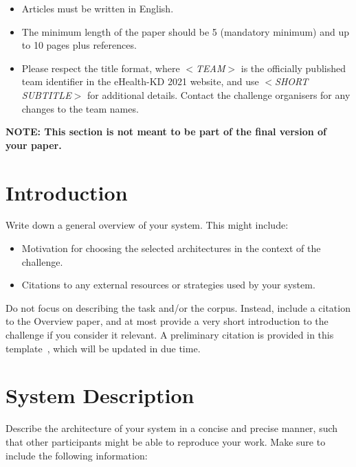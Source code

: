 \documentclass[
]{ceurart}
\begin{document}
\begin{itemize}
    \item Articles must be written in English.
    \item The minimum length of the paper should be 5 (mandatory minimum) and up to 10 pages plus references.
    \item Please respect the title format, where \textit{$<$TEAM$>$} is the officially published team identifier in the eHealth-KD 2021 website, and use \textit{$<$SHORT SUBTITLE$>$} for additional details. 
    Contact the challenge organisers for any changes to the team names.
\end{itemize}

\textbf{NOTE: This section is not meant to be part of the final version of your paper.}

\section{Introduction}

Write down a general overview of your system. This might include:
\begin{itemize}
    \item Motivation for choosing the selected architectures in the context of the challenge.
    \item Citations to any external resources or strategies used by your system.
\end{itemize}

Do not focus on describing the task and/or the corpus. Instead, include a citation to the Overview paper, and at most provide a very short
introduction to the challenge if you consider it relevant.
A preliminary citation is provided in this template~\cite{overview_ehealthkd2021}, which will be updated
in due time.

\section{System Description}

Describe the architecture of your system in a concise and precise manner, such that other participants might be able to reproduce your work.
Make sure to include the following information:
\end{document}
